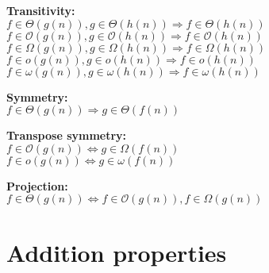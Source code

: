 \documentclass{article}
\begin{document}
 \textbf{Transitivity:}  \\  $ f \in \Theta(g(n)),  g \in \Theta(h(n)) \Rightarrow  f \in \Theta(h(n))$ \\
 $ f \in \mathcal{O}(g(n)),  g \in \mathcal{O}(h(n)) \Rightarrow  f \in \mathcal{O}(h(n))$ \\
 $ f \in \Omega(g(n)),  g \in \Omega(h(n)) \Rightarrow  f \in \Omega(h(n))$ \\
 $ f \in o(g(n)),  g \in o(h(n)) \Rightarrow  f \in o(h(n))$ \\
 $ f \in \omega(g(n)),  g \in \omega(h(n)) \Rightarrow  f \in \omega(h(n))$
  \hfill\break

 \textbf{Symmetry:}  \\  $ f \in \Theta(g(n)) \Rightarrow g \in \Theta(f(n)) $
 \hfill\break

 \textbf{Transpose symmetry:}  \\  $ f \in \mathcal{O}(g(n)) \Leftrightarrow g \in \Omega(f(n)) $
 \\  $ f \in o(g(n)) \Leftrightarrow g \in \omega(f(n)) $
 \hfill\break
 
  \textbf{Projection:}  \\  $ f \in \Theta(g(n)) \Leftrightarrow f \in \mathcal{O}(g(n)), f \in \Omega(g(n)) $
 \hfill\break
 
\section{Addition properties}
 
\end{document}
